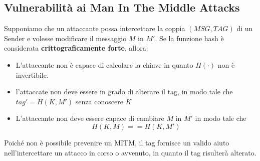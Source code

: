 \subsection{Vulnerabilità ai Man In The Middle Attacks}
Supponiamo che un attaccante possa intercettare la coppia $(MSG,TAG)$ di un Sender e volesse modificare il messaggio $M$ in $M'$. Se la funzione hash è considerata \textbf{crittograficamente forte}, allora:
\begin{itemize}
    \item L'attaccante non è capace di calcolare la chiave in quanto $H(\cdot)$ non è invertibile.
    \item l'attaccate non deve essere in grado di alterare il tag, in modo tale che $tag'=H(K,M')$ senza conoscere $K$
    \item L'attaccante non deve essere capace di cambiare $M$ in $M'$ in modo tale che \[H(K,M)==H(K,M')\]
\end{itemize}
Poiché non è possibile prevenire un MITM, il tag fornisce un valido aiuto nell'intercettare un attacco in corso o avvenuto, in quanto il tag risulterà alterato.
